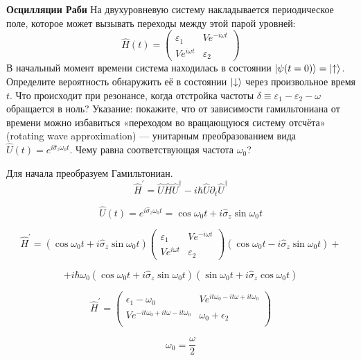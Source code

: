\newpage
\begin{problem}{\textbf{Осцилляции Раби}}
	На двухуровневую систему накладывается периодическое поле, которое может вызывать переходы между этой парой
	уровней:
	$$
	\hat{H}(t)=\left(\begin{array}{cc}{\varepsilon_{1}} & {V e^{-i \omega t}} \\ {V e^{i \omega t}} & {\varepsilon_{2}}\end{array}\right)
	$$
	В начальный момент времени система находилась в состоянии $|\psi(t=0)\rangle=\ket{\uparrow}$. Определите вероятность обнаружить её
	в состоянии $\ket{\downarrow}$  через произвольное время $t$. Что происходит при резонансе, когда отстройка частоты $\delta \equiv \varepsilon_{1}-\varepsilon_{2}-\omega$ обращается в ноль? Указание: покажите, что от зависимости гамильтониана от времени можно избавиться «переходом во вращающуюся
	систему отсчёта» (rotating wave approximation) — унитарным преобразованием вида $\hat{U}(t)=e^{i \hat{\sigma}_{z} \omega_{0} t}$.
	Чему равна соответствующая частота $\omega_{0}$?
	
\end{problem}

\begin{solution}
	Для начала преобразуем Гамильтониан.
	$$
	\hat{H}^{\prime}=\hat{U} \hat{H} \hat{U}^{\dagger}-i \hbar \hat{U} \partial_{t} \hat{U}^{\dagger}
	$$
	
	$$
	\hat{U}(t)=e^{i \hat{\sigma}_{z} \omega_{0} t} = \cos \omega_{0} t +i \hat{\sigma}_{z} \sin \omega_{0} t
	$$
	
	$$
	\hat{H}^{\prime} = \left( \cos \omega_{0} t +i \hat{\sigma}_{z} \sin \omega_{0} t \right)\left(\begin{array}{cc}{\varepsilon_{1}} & {V e^{-i \omega t}} \\ {V e^{i \omega t}} & {\varepsilon_{2}}\end{array}\right) \left( \cos \omega_{0} t -i \hat{\sigma}_{z} \sin \omega_{0} t \right) + 
	$$
	
	$$ + i\hbar \omega_{0} \left( \cos \omega_{0} t +i \hat{\sigma}_{z} \sin \omega_{0} t \right) \left( \sin \omega_{0} t +i \hat{\sigma}_{z} \cos \omega_{0} t \right)
	$$
	
	$$
	\hat{H}^{\prime} =\left(
	\begin{array}{cc}
	\epsilon_1 - \omega _0 &  V
	e^{i t \omega _0-i t \omega +i t \omega _0} \\
 	V e^{-i t \omega_0 + i t \omega -i t \omega _0} & \omega _0 +\epsilon_2   \\
	\end{array}
	\right)
	$$
	
	$$
	\omega_0 = \frac{\omega}{2}
	$$
	
	
\end{solution}


